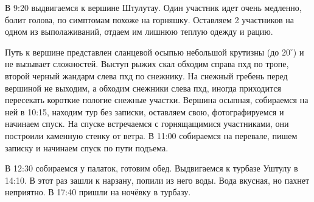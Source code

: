     В 9:20 выдвигаемся к вершине Штулутау. Один участник идет очень медленно, болит голова, по симптомам похоже на
    горняшку. Оставляем 2 участников на одном из выполаживаний, отдаем им лишнюю теплую одежду и рацию.

    Путь к вершине представлен сланцевой осыпью небольшой крутизны (до $20^\circ$) и не вызывает сложностей. Выступ
    рыжих скал обходим справа пхд по тропе, второй черный жандарм слева пхд по снежнику. На снежный гребень перед вершиной
    не выходим, а обходим снежники слева пхд, иногда приходится пересекать короткие пологие снежные участки. Вершина
    осыпная, собираемся на ней в 10:15, находим тур без записки, оставляем свою, фотографируемся и начинаем спуск.
    На спуске встречаемся с горнящащимися участниками, они построили каменную стенку от ветра. В 11:00 собираемся на
    перевале, пишем записку и начинаем спуск по пути подъема.

    В 12:30 собираемся у палаток, готовим обед. Выдвигаемся к турбазе Уштулу в 14:10. В этот раз зашли к нарзану, попили
    из него воды. Вода вкусная, но пахнет неприятно. В 17:40 пришли на ночёвку в турбазу.

    
    \FloatBarrier
    




